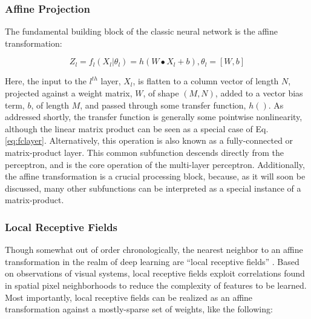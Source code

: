 \subsubsection{Affine Projection}

The fundamental building block of the classic neural network is the affine transformation:

\begin{equation}
\label{eq:fclayer}
Z_l = f_l(X_l \vert \theta_l) = h( W \bullet X_{l} + b), \theta_l = [W, b]
\end{equation}

\noindent Here, the input to the $l^{th}$ layer, $X_l$, is flatten to a column vector of length $N$, projected against a weight matrix, $W$, of shape $(M, N)$, added to a vector bias term, $b$, of length $M$, and passed through some transfer function, $h()$.
As addressed shortly, the transfer function is generally some pointwise nonlinearity, although the linear matrix product can be seen as a special case of Eq. \ref{eq:fclayer}.
Alternatively, this operation is also known as a fully-connected or matrix-product layer.
This common subfunction descends directly from the perceptron, and is the core operation of the multi-layer perceptron.
Additionally, the affine transformation is a crucial processing block, because, as it will soon be discussed, many other subfunctions can be interpreted as a special instance of a matrix-product.

\subsubsection{Local Receptive Fields}

Though somewhat out of order chronologically, the nearest neighbor to an affine transformation in the realm of deep learning are ``local receptive fields'' \cite{someone}.
Based on observations of visual systems, local receptive fields exploit correlations found in spatial pixel neighborhoods to reduce the complexity of features to be learned.
Most importantly, local receptive fields can be realized as an affine transformation against a mostly-sparse set of weights, like the following:

